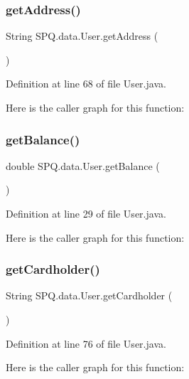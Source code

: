 \subsubsection{\texorpdfstring{get\+Address()}{getAddress()}}
{\footnotesize\ttfamily String S\+P\+Q.\+data.\+User.\+get\+Address (\begin{DoxyParamCaption}{ }\end{DoxyParamCaption})}



Definition at line 68 of file User.\+java.

Here is the caller graph for this function\+:
\mbox{\label{class_s_p_q_1_1data_1_1_user_a03cc880edbf4758b44318af1587824e5}} 
\subsubsection{\texorpdfstring{get\+Balance()}{getBalance()}}
{\footnotesize\ttfamily double S\+P\+Q.\+data.\+User.\+get\+Balance (\begin{DoxyParamCaption}{ }\end{DoxyParamCaption})}



Definition at line 29 of file User.\+java.

Here is the caller graph for this function\+:
\mbox{\label{class_s_p_q_1_1data_1_1_user_a6184a8aa1ccfc02796356f648ebf37ee}} 
\subsubsection{\texorpdfstring{get\+Cardholder()}{getCardholder()}}
{\footnotesize\ttfamily String S\+P\+Q.\+data.\+User.\+get\+Cardholder (\begin{DoxyParamCaption}{ }\end{DoxyParamCaption})}



Definition at line 76 of file User.\+java.

Here is the caller graph for this function\+:
\mbox{\label{class_s_p_q_1_1data_1_1_user_ab847d5c61fe4980ae2a15a537b22939b}} 
